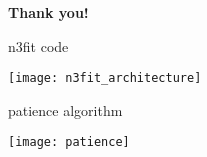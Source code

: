 
{
\begin{frame}
\vspace{0.5\textheight}
\centering \Large \color{white} \textbf{Thank you!}
\end{frame}
}

\begin{frame}{n3fit code}

\vspace*{\titleskip}
\begin{center}
\texttt{[image: n3fit\_architecture]}
\end{center}

\end{frame}

\begin{frame}{patience algorithm}

\vspace*{\titleskip}
\begin{center}
\texttt{[image: patience]}
\end{center}

\end{frame}